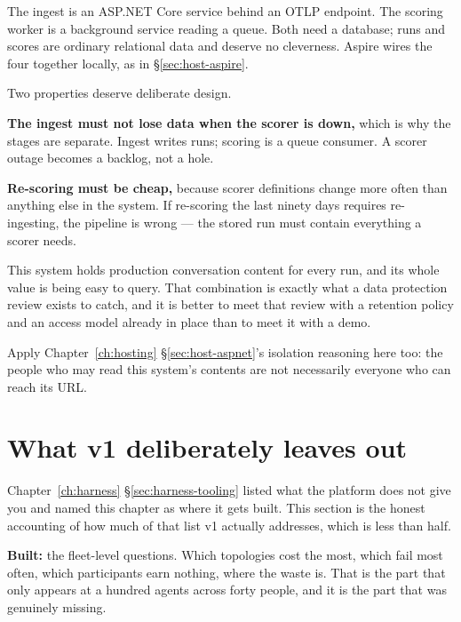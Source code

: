 The ingest is an ASP.NET Core service behind an OTLP endpoint. The scoring worker
is a background service reading a queue. Both need a database; runs and scores
are ordinary relational data and deserve no cleverness. Aspire wires the four
together locally, as in \S\ref{sec:host-aspire}.

Two properties deserve deliberate design.

\textbf{The ingest must not lose data when the scorer is down,} which is why the
stages are separate. Ingest writes runs; scoring is a queue consumer. A scorer
outage becomes a backlog, not a hole.

\textbf{Re-scoring must be cheap,} because scorer definitions change more often
than anything else in the system. If re-scoring the last ninety days requires
re-ingesting, the pipeline is wrong --- the stored run must contain everything a
scorer needs.

\begin{warning}
This system holds production conversation content for every run, and its whole
value is being easy to query. That combination is exactly what a data protection
review exists to catch, and it is better to meet that review with a retention
policy and an access model already in place than to meet it with a demo.

Apply Chapter~\ref{ch:hosting} \S\ref{sec:host-aspnet}'s isolation reasoning
here too: the people who may read this system's contents are not necessarily
everyone who can reach its URL.
\end{warning}

\section{What v1 deliberately leaves out}
\label{sec:cap-omissions}

Chapter~\ref{ch:harness} \S\ref{sec:harness-tooling} listed what the platform
does not give you and named this chapter as where it gets built. This section is
the honest accounting of how much of that list v1 actually addresses, which is
less than half.

\textbf{Built:} the fleet-level questions. Which topologies cost the most, which
fail most often, which participants earn nothing, where the waste is. That is the
part that only appears at a hundred agents across forty people, and it is the
part that was genuinely missing.

